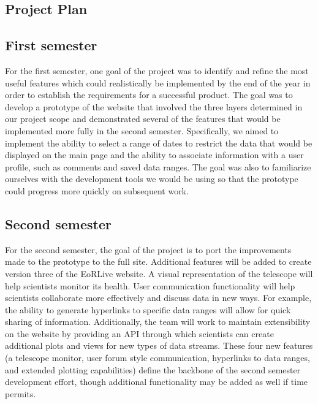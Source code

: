 \documentclass[12pt]{article}
\begin{document}
\begin{spacing}{1.5}
\section{Project Plan}
\subsection{First semester}
For the first semester, one goal of the project was to identify and refine the most useful features which could realistically be implemented by the end of the year in order to establish the requirements for a successful product. The goal was to develop a prototype of the website that involved the three layers determined in our project scope and demonstrated several of the features that would be implemented more fully in the second semester. Specifically, we aimed to implement the ability to select a range of dates to restrict the data that would be displayed on the main page and the ability to associate information with a user profile, such as comments and saved data ranges. The goal was also to familiarize ourselves with the development tools we would be using so that the prototype could progress more quickly on subsequent work.
\subsection{Second semester}
For the second semester, the goal of the project is to port the improvements made to the prototype to the full site. Additional features will be added to create version three of the EoRLive website. A visual representation of the telescope will help scientists monitor its health. User communication functionality will help scientists collaborate more effectively and discuss data in new ways. For example, the ability to generate hyperlinks to specific data ranges will allow for quick sharing of information. Additionally, the team will work to maintain extensibility on the website by providing an API through which scientists can create additional plots and views for new types of data streams. These four new features (a telescope monitor, user forum style communication, hyperlinks to data ranges, and extended plotting capabilities) define the backbone of the second semester development effort, though additional functionality may be added as well if time permits.


\end{spacing}
\end{document}
